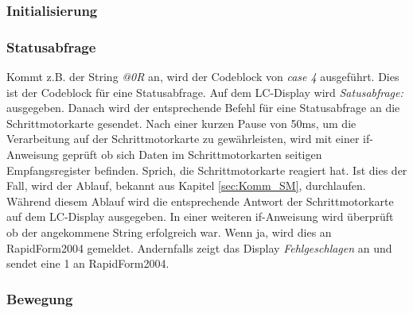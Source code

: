 \subsubsection{Initialisierung}

\subsubsection{Statusabfrage}
Kommt z.B. der String \emph{@0R} an, wird der Codeblock von \emph{case 4} ausgeführt. Dies ist der Codeblock für eine Statusabfrage. Auf dem LC-Display wird \emph{Satusabfrage:} ausgegeben. Danach wird der entsprechende Befehl für eine Statusabfrage an die Schrittmotorkarte gesendet. Nach einer kurzen Pause von 50ms, um die Verarbeitung auf der Schrittmotorkarte zu gewährleisten, wird mit einer if-Anweisung geprüft ob sich Daten im Schrittmotorkarten seitigen Empfangsregister befinden. Sprich, die Schrittmotorkarte reagiert hat. Ist dies der Fall, wird der Ablauf, bekannt aus Kapitel \ref{sec:Komm_SM}, durchlaufen. Während diesem Ablauf wird die entsprechende Antwort der Schrittmotorkarte auf dem LC-Display ausgegeben. In einer weiteren if-Anweisung wird überprüft ob der angekommene String erfolgreich war. Wenn ja, wird dies an RapidForm2004 gemeldet. Andernfalls zeigt das Display \emph{Fehlgeschlagen} an und sendet eine 1 an RapidForm2004.\\


\subsubsection{Bewegung}

\lstset{language=C, basicstyle=\footnotesize, showstringspaces=false, tabsize=8}


